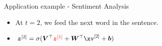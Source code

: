 \begin{frame} {Application example - Sentiment Analysis}
  \begin{itemize}
    \item At $t = 2$, we feed the next word in the sentence.
    \item $\bm{z}^{[2]} = \sigma(\bm{V}^\top\textcolor{red}{\bm{z}^{[1]}} + \bm{W}^\top \xv^{[2]} + \bm{b})$
  \end{itemize}
  \begin{figure}
      \centering
  \end{figure}
\end{frame}

